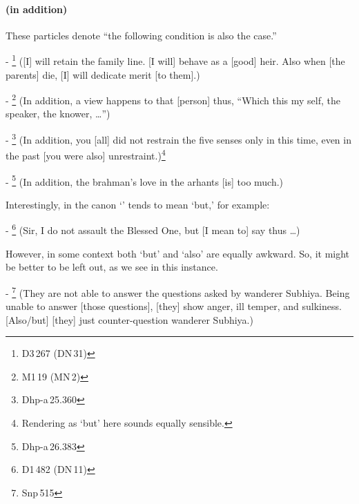 \paragraph*{ (in addition)} These particles denote ``the following condition is also the case.''\par
- \footnote{D3\,267 (DN\,31)} ([I] will retain the family line. [I will] behave as a [good] heir. Also when [the parents] die, [I] will dedicate merit [to them].)\par
- \footnote{M1\,19 (MN\,2)} (In addition, a view happens to that [person] thus, ``Which this my self, the speaker, the knower, \ldots'')\par 
- \footnote{Dhp-a\,25.360} (In addition, you [all] did not restrain the five senses only in this time, even in the past [you were also] unrestraint.)\footnote{Rendering  as `but' here sounds equally sensible.}\par 
- \footnote{Dhp-a\,26.383} (In addition, the brahman's love in the arhants [is] too much.)\par

\medskip
Interestingly, in the canon `' tends to mean `but,' for example:\par
- \footnote{D1\,482 (DN\,11)} (Sir, I do not assault the Blessed One, but [I mean to] say thus \ldots)\par 

\medskip
However, in some context both `but' and `also' are equally awkward. So, it might be better to be left out, as we see in this instance.\par
- \footnote{Snp\,515} (They are not able to answer the questions asked by wanderer Subhiya. Being unable to answer [those questions], [they] show anger, ill temper, and sulkiness. [Also/but] [they] just counter-question wanderer Subhiya.)\par

